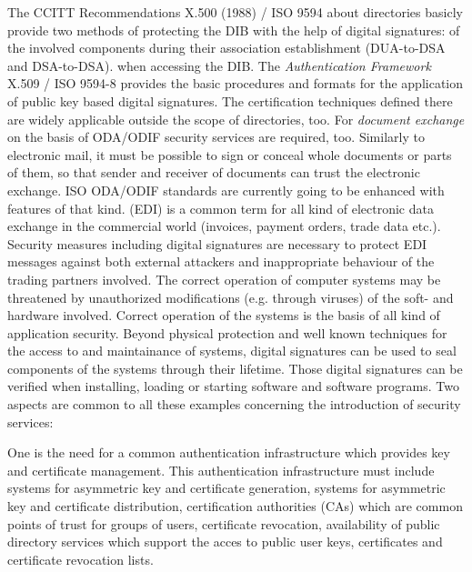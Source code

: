    The CCITT Recommendations X.500 (1988) / ISO 9594 about directories 
   basicly provide two methods of protecting the DIB with the
   help of digital signatures: 
   \be
       of the involved components during
            their association establishment (DUA-to-DSA and DSA-to-DSA).
       when accessing the DIB.
   \ee
   The  {\em Authentication Framework} X.509 / ISO 9594-8 provides
   the basic procedures and formats for the application of public key
   based digital signatures. The certification
   techniques defined there are widely applicable outside the scope of
   directories, too.
\m For {\em document exchange} on the basis of ODA/ODIF security services are required, too.
   Similarly to electronic mail, it must be possible to sign or conceal whole
   documents or parts of them, so that sender and receiver of documents can trust
   the electronic exchange. ISO ODA/ODIF standards are currently going to be
   enhanced with features of that kind.
 (EDI) is a common term for all kind of electronic
   data exchange in the commercial world (invoices, payment orders, trade data etc.).
   Security measures including digital signatures are necessary to protect EDI
   messages against both external attackers and inappropriate behaviour of the trading
   partners involved.
\m The correct operation of computer systems may be threatened by unauthorized 
   modifications (e.g. through viruses) of the soft- and hardware involved. Correct
   operation of the systems is the basis of all kind of application security.
   Beyond physical protection and well known techniques for the access to and maintainance of
   systems, digital
   signatures can be used to seal components of the systems through their lifetime. Those
   digital signatures can be verified when installing, loading or starting software
   and software programs.
\ei
Two aspects are common to all these examples concerning the introduction of security
services:

One is the need for a common authentication infrastructure which
provides key and certificate management. This authentication infrastructure must include
\bi
\m systems for asymmetric key and certificate generation, 
\m systems for asymmetric key and certificate distribution,
\m certification authorities (CAs) which are common points of
   trust for groups of users,
\m certificate revocation,
\m availability of public directory services which support the acces to 
   public user keys, certificates and certificate revocation lists. 
\ei

